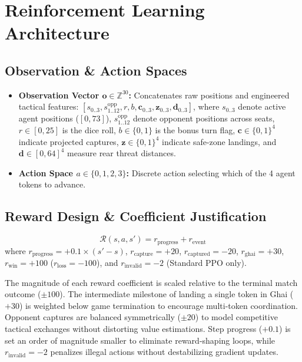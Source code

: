 \documentclass[10pt,twocolumn,a4paper]{article}
\begin{document}
\section{Reinforcement Learning Architecture}

\subsection{Observation \& Action Spaces}
\begin{itemize}[leftmargin=*,noitemsep,topsep=1pt]
    \item \textbf{Observation Vector $\mathbf{o} \in \mathbb{Z}^{30}$:} Concatenates raw positions and engineered tactical features: $[s_{0..3}, s^{\text{opp}}_{1..12}, r, b, \mathbf{c}_{0..3}, \mathbf{z}_{0..3}, \mathbf{d}_{0..3}]$, where $s_{0..3}$ denote active agent positions ($[0,73]$), $s^{\text{opp}}_{1..12}$ denote opponent positions across seats, $r \in [0,25]$ is the dice roll, $b \in \{0,1\}$ is the bonus turn flag, $\mathbf{c} \in \{0,1\}^4$ indicate projected captures, $\mathbf{z} \in \{0,1\}^4$ indicate safe-zone landings, and $\mathbf{d} \in [0,64]^4$ measure rear threat distances.
    \item \textbf{Action Space $a \in \{0, 1, 2, 3\}$:} Discrete action selecting which of the 4 agent tokens to advance.
\end{itemize}

\subsection{Reward Design \& Coefficient Justification}
\begin{equation}
\mathcal{R}(s, a, s') = r_{\text{progress}} + r_{\text{event}}
\end{equation}
where $r_{\text{progress}} = +0.1 \times (s' - s)$, $r_{\text{capture}} = +20$, $r_{\text{captured}} = -20$, $r_{\text{ghai}} = +30$, $r_{\text{win}} = +100$ ($r_{\text{loss}} = -100$), and $r_{\text{invalid}} = -2$ (Standard PPO only).

The magnitude of each reward coefficient is scaled relative to the terminal match outcome ($\pm 100$). The intermediate milestone of landing a single token in Ghai ($+30$) is weighted below game termination to encourage multi-token coordination. Opponent captures are balanced symmetrically ($\pm 20$) to model competitive tactical exchanges without distorting value estimations. Step progress ($+0.1$) is set an order of magnitude smaller to eliminate reward-shaping loops, while $r_{\text{invalid}} = -2$ penalizes illegal actions without destabilizing gradient updates.
\end{document}
